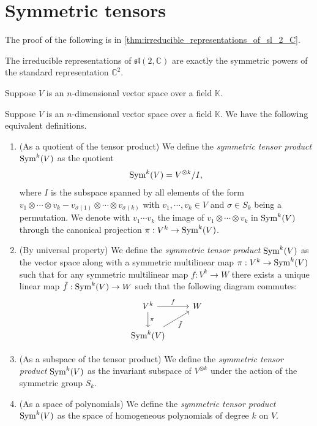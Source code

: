 \documentclass{report}
\begin{document}
\section{Symmetric tensors}
The proof of the following is in \cref{thm:irreducible_representations_of_sl_2_C}.
\begin{fact}
    The irreducible representations of $\mathfrak{sl}(2, \mathbb C)$ are exactly the symmetric powers of the standard representation $\mathbb C^2$.
\end{fact}
Suppose $V$ is an $n$-dimensional vector space over a field $\mathbb{K}$.
\begin{definition}
    Suppose $V$ is an $n$-dimensional vector space over a field $\mathbb{K}$.
    We have the following equivalent definitions.
    \begin{enumerate}[label = (\roman*)]
        \item (As a quotient of the tensor product) 
        We define the \emph{symmetric tensor product} $\operatorname{Sym}^k(V)$ as the quotient
        \[
        \operatorname{Sym}^k(V) = V^{\otimes k}/I,
        \]
        where $I$ is the subspace spanned by all elements of the form $v_1 \otimes \cdots \otimes v_k - v_{\sigma(1)} \otimes \cdots \otimes v_{\sigma(k)}$ with $ v_1, \cdots, v_k \in V $ and $\sigma \in S_k$ being a permutation.
        We denote with $v_1 \cdots v_k$ the image of $v_1 \otimes \cdots \otimes v_k$ in $\operatorname{Sym}^k(V)$ through the canonical projection $\pi: V^k \to \operatorname{Sym}^k(V)$.
        \item (By universal property)
        We define the \emph{symmetric tensor product} $\operatorname{Sym}^k(V)$ as the vector space along with a symmetric multilinear map $\pi: V^k \to \operatorname{Sym}^k(V)$ such that for any symmetric multilinear map $f: V^k \to W$ there exists a unique linear map $\tilde f: \operatorname{Sym}^k(V) \to W$ such that the following diagram commutes:
        \[
        \begin{tikzcd}
            V^k \arrow[r, "f"] \arrow[d, "\pi"] & W \\
            \Sym^k(V) \arrow[ur, "\tilde f"']
        \end{tikzcd}
        \]
        \item (As a subspace of the tensor product)
        We define the \emph{symmetric tensor product} $\operatorname{Sym}^k(V)$ as the invariant subspace of $V^{\otimes k}$ under the action of the symmetric group $S_k$.
        \item (As a space of polynomials)
        We define the \emph{symmetric tensor product} $\operatorname{Sym}^k(V)$ as the space of homogeneous polynomials of degree $k$ on $V$.
    \end{enumerate}
\end{definition}
\end{document}
